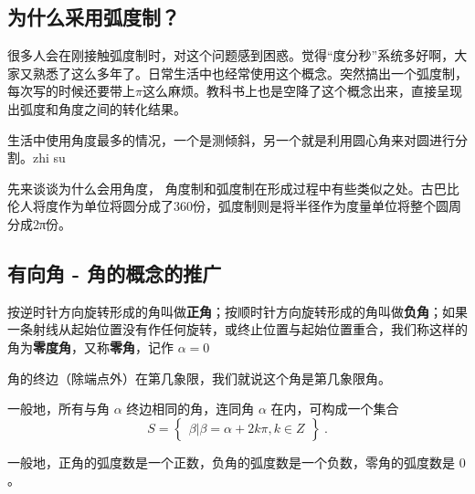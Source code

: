 \subsection{为什么采用弧度制？}

很多人会在刚接触弧度制时，对这个问题感到困惑。觉得“度分秒”系统多好啊，大家又熟悉了这么多年了。日常生活中也经常使用这个概念。突然搞出一个弧度制，每次写的时候还要带上$\pi$这么麻烦。教科书上也是空降了这个概念出来，直接呈现出弧度和角度之间的转化结果。

生活中使用角度最多的情况，一个是测倾斜，另一个就是利用圆心角来对圆进行分割。zhi su

先来谈谈为什么会用角度，
角度制和弧度制在形成过程中有些类似之处。古巴比伦人将度作为单位将圆分成了360份，弧度制则是将半径作为度量单位将整个圆周分成2π份。

\subsection{有向角 - 角的概念的推广}


按逆时针方向旋转形成的角叫做\textbf{正角}；按顺时针方向旋转形成的角叫做\textbf{负角}；如果一条射线从起始位置没有作任何旋转，或终止位置与起始位置重合，我们称这样的角为\textbf{零度角}，又称\textbf{零角}，记作 $\alpha = 0$

角的终边（除端点外）在第几象限，我们就说这个角是第几象限角。

一般地，所有与角 $\alpha$ 终边相同的角，连同角 $\alpha$ 在内，可构成一个集合
\begin{equation}
S = \begin{Bmatrix} \beta|\beta=\alpha+2k\pi,k \in Z \end{Bmatrix}~.
\end{equation}


一般地，正角的弧度数是一个正数，负角的弧度数是一个负数，零角的弧度数是 $0$。
